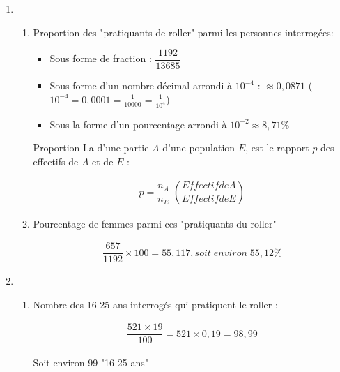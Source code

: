 \documentclass[12pt,a4paper]{article}
\begin{document}
\begin{enumerate}[label=\arabic*.]
	\item 
	\begin{enumerate} [label=\alph*) ]
		\item Proportion des "pratiquants de roller" parmi les personnes interrogées:
		\begin{itemize}
			\item Sous forme de fraction : $\dfrac{1192}{13685}$
			\item Sous forme d'un nombre décimal arrondi à $10^{-4}$ : $\approx 0,0871$ ($10^{-4} = 0,0001=\frac{1}{10000}=\frac{1}{10^4}$)
			\item Sous la forme d'un pourcentage arrondi à $10^{-2} \approx 8,71 \% $
		\end{itemize}
		
		\vspace*{1cm}
		
		\hspace*{-5cm} \begin{mybilan2}{Proportion}
			La  d'une partie $A$ d'une population $E$, est le rapport $p$ des effectifs de $A$ et de $E$ :
			
			\begin{eqnarray*}
			p = \dfrac{n_A}{n_E} \; \left(\dfrac{Effectif de A}{Effectif de E}\right)
			\end{eqnarray*}
		\end{mybilan2}
				
		\item Pourcentage de femmes parmi ces "pratiquants du roller"
		
		\begin{eqnarray*}
			 \dfrac{657}{1192} \times 100 = 55,117, soit\; environ\; 55,12 \%
		\end{eqnarray*}
						

	\end{enumerate}
	
	\item \begin{enumerate}[label=\alph*) ]
		\item Nombre des 16-25 ans interrogés qui pratiquent le roller :
		
		\begin{eqnarray*}
			\dfrac{521 \times 19}{100} = 521 \times 0,19 = 98,99
		\end{eqnarray*}
		
		Soit environ 99 "16-25 ans"
		

\end{enumerate}
\end{enumerate}
\end{document}
